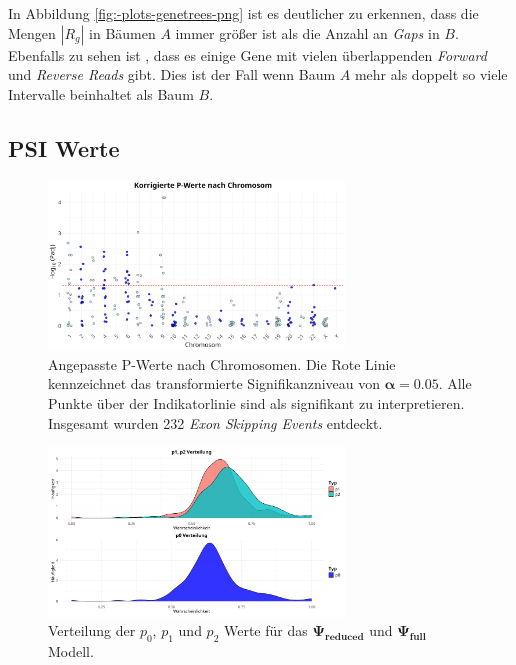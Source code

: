 \documentclass[12pt]{article}
\begin{document}
In Abbildung \ref{fig:-plots-genetrees-png} ist es deutlicher zu erkennen, 
dass die Mengen $|R_{g}|$ in Bäumen $A$ immer grö\ss er ist als die Anzahl an
\textit{Gaps} in $B$.
Ebenfalls zu sehen ist , dass es einige Gene mit vielen überlappenden
\textit{Forward} und \textit{Reverse Reads} gibt. Dies ist der Fall wenn Baum $A$ mehr als doppelt so viele 
Intervalle beinhaltet als Baum $B$.





\subsection{PSI Werte}
\begin{figure}[htpb]
    \centering
    \includegraphics[width=0.7\textwidth]{./plots/neg_log10_padj_by_chromosome.png}
    \caption{Angepasste P-Werte nach Chromosomen. Die Rote Linie kennzeichnet das transformierte Signifikanzniveau von $\mathbf{\alpha = 0.05}$.
    Alle Punkte über der Indikatorlinie sind als signifikant zu interpretieren. Insgesamt wurden 232 \textit{Exon Skipping Events} entdeckt.}
    \label{fig:neg_log10_padj_by_chromosome-png}
\end{figure}

\begin{figure}[htpb]
    \centering
    \includegraphics[width=0.7\textwidth]{./plots/prob.png}
    \caption{Verteilung der $p_{0}$, $p_{1}$ und $p_{2}$ Werte für das $\mathbf{\Psi_{reduced}}$ und $\mathbf{\Psi_{full}}$ Modell.}
    \label{fig:prob-png}
\end{figure}
\end{document}
